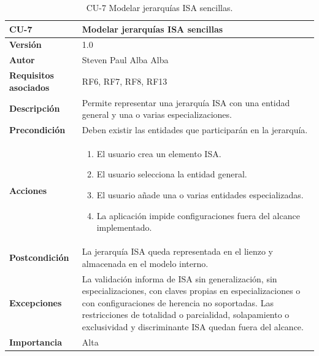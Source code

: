 \begin{table}[p]
\centering
\begin{tabularx}{\linewidth}{ p{} p{} }
\toprule
\textbf{CU-7} & \textbf{Modelar jerarquías ISA sencillas}\\
\toprule
\textbf{Versión} & 1.0 \\
\textbf{Autor} & Steven Paul Alba Alba \\
\textbf{Requisitos asociados} & RF6, RF7, RF8, RF13 \\
\textbf{Descripción} & Permite representar una jerarquía ISA con una entidad general y una o varias especializaciones. \\
\textbf{Precondición} & Deben existir las entidades que participarán en la jerarquía. \\
\textbf{Acciones} &
\begin{enumerate}
\def\labelenumi{\arabic{enumi}.}
\tightlist
\item El usuario crea un elemento ISA.
\item El usuario selecciona la entidad general.
\item El usuario añade una o varias entidades especializadas.
\item La aplicación impide configuraciones fuera del alcance implementado.
\end{enumerate}\\
\textbf{Postcondición} & La jerarquía ISA queda representada en el lienzo y almacenada en el modelo interno. \\
\textbf{Excepciones} & La validación informa de ISA sin generalización, sin especializaciones, con claves propias en especializaciones o con configuraciones de herencia no soportadas. Las restricciones de totalidad o parcialidad, solapamiento o exclusividad y discriminante ISA quedan fuera del alcance. \\
\textbf{Importancia} & Alta \\
\bottomrule
\end{tabularx}
\caption{CU-7 Modelar jerarquías ISA sencillas.}
\end{table}

